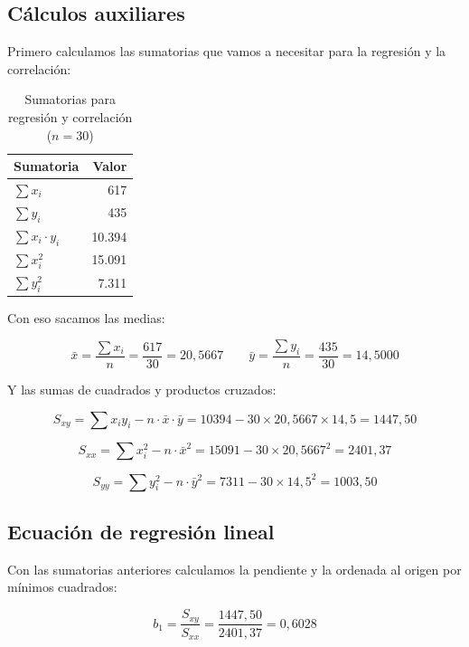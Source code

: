 \documentclass[12pt,a4paper]{article}
\begin{document}
\subsection{Cálculos auxiliares}

Primero calculamos las sumatorias que vamos a necesitar para la regresión y la correlación:

\vspace{6pt}
\begin{table}[H]
\centering
\caption{Sumatorias para regresión y correlación ($n = 30$)}
\vspace{4pt}
\begin{tabular}{lr}
\toprule
\textbf{Sumatoria} & \textbf{Valor} \\
\midrule
$\sum x_i$ & 617 \\[4pt]
$\sum y_i$ & 435 \\[4pt]
$\sum x_i \cdot y_i$ & 10.394 \\[4pt]
$\sum x_i^2$ & 15.091 \\[4pt]
$\sum y_i^2$ & 7.311 \\
\bottomrule
\end{tabular}
\end{table}
\vspace{4pt}

Con eso sacamos las medias:

\vspace{4pt}
$$\bar{x} = \frac{\sum x_i}{n} = \frac{617}{30} = 20{,}5667 \qquad \bar{y} = \frac{\sum y_i}{n} = \frac{435}{30} = 14{,}5000$$
\vspace{4pt}

Y las sumas de cuadrados y productos cruzados:

\vspace{4pt}
$$S_{xy} = \sum x_i y_i - n \cdot \bar{x} \cdot \bar{y} = 10394 - 30 \times 20{,}5667 \times 14{,}5 = 1447{,}50$$

$$S_{xx} = \sum x_i^2 - n \cdot \bar{x}^2 = 15091 - 30 \times 20{,}5667^2 = 2401{,}37$$

$$S_{yy} = \sum y_i^2 - n \cdot \bar{y}^2 = 7311 - 30 \times 14{,}5^2 = 1003{,}50$$

\subsection{Ecuación de regresión lineal}

Con las sumatorias anteriores calculamos la pendiente y la ordenada al origen por mínimos cuadrados:

\vspace{4pt}
$$b_1 = \frac{S_{xy}}{S_{xx}} = \frac{1447{,}50}{2401{,}37} = 0{,}6028$$
\end{document}

